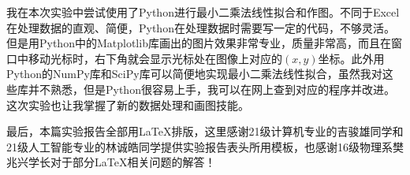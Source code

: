 \documentclass[12pt]{article}
\begin{document}
我在本次实验中尝试使用了Python进行最小二乘法线性拟合和作图。不同于Excel在处理数据的直观、简便，Python在处理数据时需要写一定的代码，不够灵活。但是用Python中的Matplotlib库画出的图片效果非常专业，质量非常高，而且在窗口中移动光标时，右下角就会显示光标处在图像上对应的$(x,y)$坐标。此外用Python的NumPy库和SciPy库可以简便地实现最小二乘法线性拟合，虽然我对这些库并不熟悉，但是Python很容易上手，我可以在网上查到对应的程序并改进。这次实验也让我掌握了新的数据处理和画图技能。

最后，本篇实验报告全部用\LaTeX{}排版，这里感谢21级计算机专业的吉骏雄同学和21级人工智能专业的林诚皓同学提供实验报告表头所用模板，也感谢16级物理系樊兆兴学长对于部分\LaTeX{}相关问题的解答！
\end{document}

